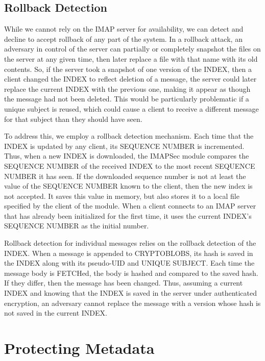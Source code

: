 \documentclass[pageno]{jpaper}
\newcommand{\project}{IMAPSec }
\begin{document}
\subsection{Rollback Detection}
\label{rollback}

While we cannot rely on the IMAP server for availability, we can detect and decline to accept rollback of any part of the system. In a rollback attack, an adversary in control of the server can partially or completely snapshot the files on the server at any given time, then later replace a file with that name with its old contents. So, if the server took a snapshot of one version of the INDEX, then a client changed the INDEX to reflect deletion of a message, the server could later replace the current INDEX with the previous one, making it appear as though the message had not been deleted. This would be particularly problematic if a unique subject is reused, which could cause a client to receive a different message for that subject than they should have seen.

To address this, we employ a rollback detection mechanism. Each time that the INDEX is updated by any client, its SEQUENCE NUMBER is incremented. Thus, when a new INDEX is downloaded, the \project module compares the SEQUENCE NUMBER of the received INDEX to the most recent SEQUENCE NUMBER it has seen. If the downloaded sequence number is not at least the value of the SEQUENCE NUMBER known to the client, then the new index is not accepted. It saves this value in memory, but also stores it to a local file specified by the client of the module. When a client connects to an IMAP server that has already been initialized for the first time, it uses the current INDEX's SEQUENCE NUMBER as the initial number.

Rollback detection for individual messages relies on the rollback detection of the INDEX. When a message is appended to CRYPTOBLOBS, its hash is saved in the INDEX along with its pseudo-UID and UNIQUE SUBJECT. Each time the message body is FETCHed, the body is hashed and compared to the saved hash. If they differ, then the message has been changed. Thus, assuming a current INDEX and knowing that the INDEX is saved in the server under authenticated encryption, an adversary cannot replace the message with a version whose hash is not saved in the current INDEX.


\section{Protecting Metadata}
\label{metadatasecurity}
\end{document}
